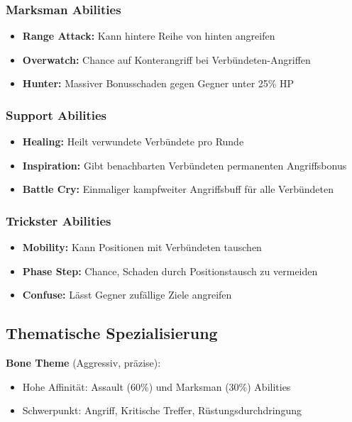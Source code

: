 \subsubsection{Marksman Abilities}
\begin{itemize}
    \item \textbf{Range Attack:} Kann hintere Reihe von hinten angreifen
    \item \textbf{Overwatch:} Chance auf Konterangriff bei Verbündeten-Angriffen
    \item \textbf{Hunter:} Massiver Bonusschaden gegen Gegner unter 25\% HP
\end{itemize}

\subsubsection{Support Abilities}
\begin{itemize}
    \item \textbf{Healing:} Heilt verwundete Verbündete pro Runde
    \item \textbf{Inspiration:} Gibt benachbarten Verbündeten permanenten Angriffsbonus
    \item \textbf{Battle Cry:} Einmaliger kampfweiter Angriffsbuff für alle Verbündeten
\end{itemize}

\subsubsection{Trickster Abilities}
\begin{itemize}
    \item \textbf{Mobility:} Kann Positionen mit Verbündeten tauschen
    \item \textbf{Phase Step:} Chance, Schaden durch Positionstausch zu vermeiden
    \item \textbf{Confuse:} Lässt Gegner zufällige Ziele angreifen
\end{itemize}

\subsection{Thematische Spezialisierung}

\textbf{Bone Theme} (Aggressiv, präzise):
\begin{itemize}
    \item Hohe Affinität: Assault (60\%) und Marksman (30\%) Abilities
    \item Schwerpunkt: Angriff, Kritische Treffer, Rüstungsdurchdringung
\end{itemize}

